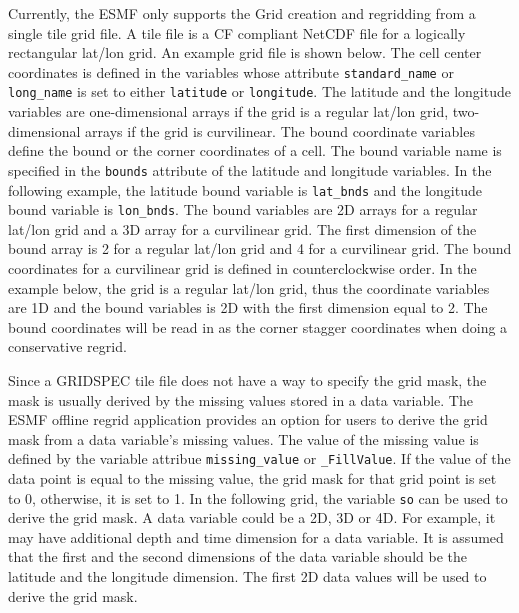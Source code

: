 Currently, the ESMF only supports the Grid creation and regridding from a single tile grid file.  A tile file 
is a CF compliant NetCDF file for a logically rectangular lat/lon grid.  An example grid file is shown below.  
The cell center coordinates is defined in the variables whose attribute {\tt standard\_name} or {\tt long\_name} is set to either {\tt latitude} or {\tt longitude}.  The latitude and the longitude variables are one-dimensional arrays if the grid is a regular lat/lon grid, two-dimensional arrays if the grid is curvilinear. The bound coordinate 
variables define the bound or the corner coordinates of a cell.  The bound variable name is specified in the
{\tt bounds} attribute of the latitude and longitude variables.  In the following example, the latitude bound 
variable is {\tt lat\_bnds} and the longitude bound variable is {\tt lon\_bnds}.  The bound variables are 2D
arrays for a regular lat/lon grid and a 3D array for a curvilinear grid.  The first dimension of the bound 
array is 2 for a regular lat/lon grid and 4 for a curvilinear grid.  The bound coordinates for a curvilinear
grid is defined in counterclockwise order.  In the example below, the grid is a regular lat/lon
grid, thus the coordinate variables are 1D and the bound variables is 2D with the first dimension equal to 2.
The bound coordinates will be read in as the corner stagger coordinates when doing a conservative regrid.

Since a GRIDSPEC tile file does not have a way to specify the grid mask, the mask is usually derived by the missing values stored in a data variable.  The ESMF offline regrid application provides an option for users to
derive the grid mask from a data variable's missing values.  The value of the missing value is defined by the
variable attribue {\tt missing\_value} or {\tt \_FillValue}.  If the value of the data point is equal to the 
missing value, the grid mask for that grid point is set to 0, otherwise, it is set to 1.   In the following
grid, the variable {\tt so} can be used to derive the grid mask.  A data variable could be a 2D, 3D or 4D. 
For example, it may have additional depth and time dimension for a data variable.    
It is assumed that the first and the second dimensions of the data variable should be the latitude and the 
longitude dimension.  The first 2D data values will be used to derive the grid mask.
 
